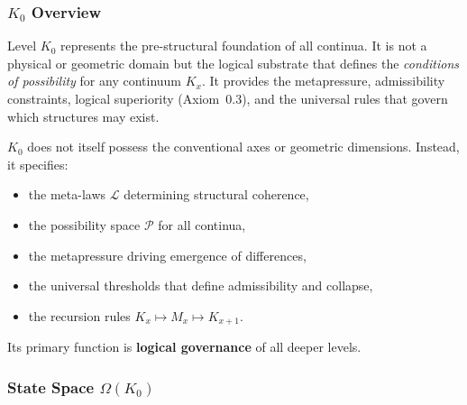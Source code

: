

\subsubsection{\texorpdfstring{$K_0$}{K_0} Overview}
\label{sec:k0-overview}

Level $K_0$ represents the pre-structural foundation of all continua.
It is not a physical or geometric domain but the logical substrate that
defines the \emph{conditions of possibility} for any continuum $K_x$.
It provides the metapressure, admissibility constraints, logical
superiority (Axiom~0.3), and the universal rules that govern which
structures may exist.

$K_0$ does not itself possess the conventional axes or geometric
dimensions.  
Instead, it specifies:
\begin{itemize}
    \item the meta-laws $\mathcal{L}$ determining structural coherence,
    \item the possibility space $\mathcal{P}$ for all continua,
    \item the metapressure driving emergence of differences,
    \item the universal thresholds that define admissibility and collapse,
    \item the recursion rules $K_x \mapsto M_x \mapsto K_{x+1}$.
\end{itemize}

Its primary function is \textbf{logical governance} of all deeper
levels.

\subsubsection{State Space \texorpdfstring{$\Omega(K_0)$}{\Omega(K_0)}}


